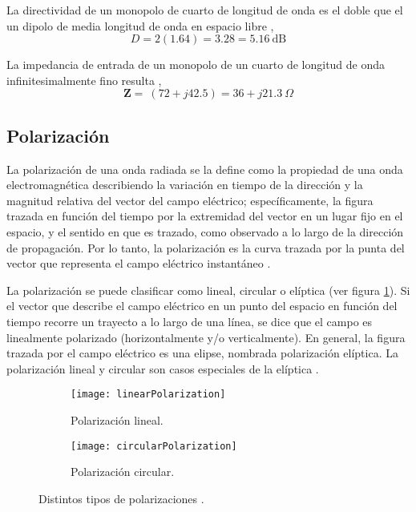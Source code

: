 La directividad de un monopolo de cuarto de longitud de onda es el doble que el un dipolo de media longitud de onda en espacio libre \cite{Stutzman2013},
\begin{equation}
  D = 2(1.64) = 3.28 = \SI{5.16}{\dB}
\end{equation}

La impedancia de entrada de un monopolo de un cuarto de longitud de onda infinitesimalmente fino resulta \cite{Stutzman2013},
\begin{equation}
  \bm{Z} = ~ (72 + j42.5) = 36 + j\SI{21.3}{\Omega}
\end{equation}

\subsection{Polarización} \label{sc:polarization}

La polarización de una onda radiada se la define como la propiedad de una onda electromagnética describiendo la variación en tiempo de la dirección y la magnitud relativa del vector del campo eléctrico; específicamente, la figura trazada en función del tiempo por la extremidad del vector en un lugar fijo en el espacio, y el sentido en que es trazado, como observado a lo largo de la dirección de propagación. Por lo tanto, la polarización es la curva trazada por la punta del vector que representa el campo eléctrico instantáneo \cite{Balanis2012}.

La polarización se puede clasificar como lineal, circular o elíptica (ver figura \ref{fig:hvPolarizations}). Si el vector que describe el campo eléctrico en un punto del espacio en función del tiempo recorre un trayecto a lo largo de una línea, se dice que el campo es linealmente polarizado (horizontalmente y/o verticalmente). En general, la figura trazada por el campo eléctrico es una elipse, nombrada polarización elíptica. La polarización lineal y circular son casos especiales de la elíptica \cite{Vita2012}.

\begin{figure}[H]
  \centering
  \begin{subfigure}[b]{0.49\textwidth}
    \texttt{[image: linearPolarization]}
    \caption{Polarización lineal.}
  \end{subfigure}
  \begin{subfigure}[b]{0.49\textwidth}
    \texttt{[image: circularPolarization]}
    \caption{Polarización circular.}
  \end{subfigure}
  \caption{Distintos tipos de polarizaciones \cite{Hecht2002}.}
  \label{fig:hvPolarizations}
\end{figure}

